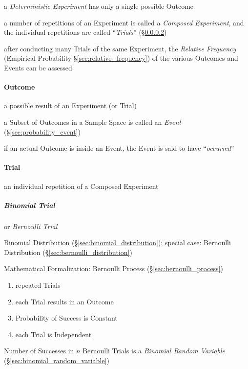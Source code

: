 a \emph{Deterministic Experiment} has only a single possible Outcome

a number of repetitions of an Experiment is called a \emph{Composed Experiment},
and the individual repetitions are called ``\emph{Trials}'' (\S\ref{sec:trial})

after conducting many Trials of the same Experiment, the \emph{Relative
  Frequency} (Empirical Probability \S\ref{sec:relative_frequency}) of the
various Outcomes and Events can be assessed



\paragraph{Outcome}\label{sec:outcome}

a possible result of an Experiment (or Trial)

a Subset of Outcomes in a Sample Space is called an \emph{Event}
(\S\ref{sec:probability_event})

if an actual Outcome is inside an Event, the Event is said to have
``\emph{occurred}''



\paragraph{Trial}\label{sec:trial}\hfill

an individual repetition of a Composed Experiment



\subparagraph{Binomial Trial}\label{sec:binomial_trial}\hfill

or \emph{Bernoulli Trial}

Binomial Distribution (\S\ref{sec:binomial_distribution}); special case:
Bernoulli Distribution (\S\ref{sec:bernoulli_distribution})

Mathematical Formalization: Bernoulli Process (\S\ref{sec:bernoulli_process})

\begin{enumerate}
  \item repeated Trials
  \item each Trial results in an Outcome
  \item Probability of Success is Constant
  \item each Trial is Independent
\end{enumerate}

Number of Successes in $n$ Bernoulli Trials is a \emph{Binomial Random
  Variable} (\S\ref{sec:binomial_random_variable})



